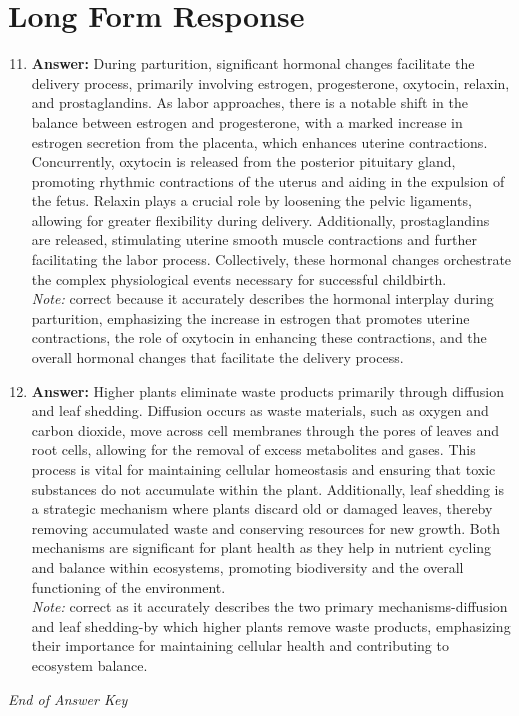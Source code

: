 \documentclass[12pt]{article}
\begin{document}
\section*{Long Form Response}
\begin{enumerate}[label=\arabic*.]
\setcounter{enumi}{10}
\item \textbf{Answer:} During parturition, significant hormonal changes facilitate the delivery process, primarily involving estrogen, progesterone, oxytocin, relaxin, and prostaglandins. As labor approaches, there is a notable shift in the balance between estrogen and progesterone, with a marked increase in estrogen secretion from the placenta, which enhances uterine contractions. Concurrently, oxytocin is released from the posterior pituitary gland, promoting rhythmic contractions of the uterus and aiding in the expulsion of the fetus. Relaxin plays a crucial role by loosening the pelvic ligaments, allowing for greater flexibility during delivery. Additionally, prostaglandins are released, stimulating uterine smooth muscle contractions and further facilitating the labor process. Collectively, these hormonal changes orchestrate the complex physiological events necessary for successful childbirth.
\\ \textit{Note:} correct because it accurately describes the hormonal interplay during parturition, emphasizing the increase in estrogen that promotes uterine contractions, the role of oxytocin in enhancing these contractions, and the overall hormonal changes that facilitate the delivery process.
\item \textbf{Answer:} Higher plants eliminate waste products primarily through diffusion and leaf shedding. Diffusion occurs as waste materials, such as oxygen and carbon dioxide, move across cell membranes through the pores of leaves and root cells, allowing for the removal of excess metabolites and gases. This process is vital for maintaining cellular homeostasis and ensuring that toxic substances do not accumulate within the plant. Additionally, leaf shedding is a strategic mechanism where plants discard old or damaged leaves, thereby removing accumulated waste and conserving resources for new growth. Both mechanisms are significant for plant health as they help in nutrient cycling and balance within ecosystems, promoting biodiversity and the overall functioning of the environment.
\\ \textit{Note:} correct as it accurately describes the two primary mechanisms-diffusion and leaf shedding-by which higher plants remove waste products, emphasizing their importance for maintaining cellular health and contributing to ecosystem balance.
\end{enumerate}

\vfill
\noindent\textit{End of Answer Key}
\end{document}
